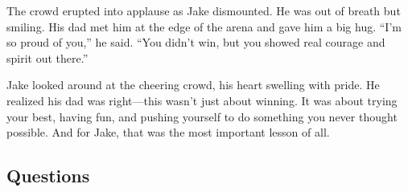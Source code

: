\documentclass[12pt]{article}
\begin{document}
\begin{tcolorbox}[colframe=black!40, colback=gray!5]
\begin{spacing}{1.15}
The crowd erupted into applause as Jake dismounted. He was out of breath but smiling. His dad met him at the edge of the arena and gave him a big hug. “I’m so proud of you,” he said. “You didn’t win, but you showed real courage and spirit out there.”

Jake looked around at the cheering crowd, his heart swelling with pride. He realized his dad was right—this wasn’t just about winning. It was about trying your best, having fun, and pushing yourself to do something you never thought possible. And for Jake, that was the most important lesson of all.

 

\end{spacing}

\end{tcolorbox}


\subsection*{Questions}
\end{document}
